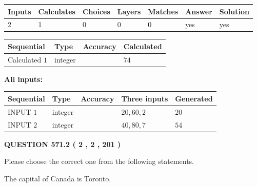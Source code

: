 \documentclass[12pt]{article}
\begin{document}
 

 
   
   
   
   
\noindent\begin{tabular}{|l|l|l|l|l|l|l|}
 \hline
Inputs & Calculates & Choices & Layers & Matches & Answer & Solution \\ \hline
 2  & 
 1  & 
 0
  & 
 0  & 
 0  & 
  yes & 
  yes 
  \\ \hline
 \end{tabular}
   
   
   
   
\noindent{}
   
   
  
  
\noindent\begin{tabular}{|l|l|l|l|}
\hline
 Sequential & Type & Accuracy & Calculated \\ 
\hline
 
 
  Calculated $  1 $ & integer &  & 
  $ 74 $ 
 \\  \hline  
 \end{tabular}
   
   
   
   
\noindent\vspace{0.1in}\hspace{-0.08in} {\textbf{\Large{All inputs: }}}
   
   
  
  
\noindent\begin{tabular}{|l|l|l|l|l|}
\hline
 Sequential & Type & Accuracy & Three inputs & Generated \\ 
\hline
 
 
  INPUT $  1 $ & integer &  & $
 20
 , 
 60
 , 
 2
 $ & $ 20 $ 
 \\  \hline  
 
 
  INPUT $  2 $ & integer &  & $
 40
 , 
 80
 , 
 7
 $ & $ 54 $ 
 \\  \hline  
 \end{tabular}
   
   
  
\vspace{0.2in}
  
{\textbf{\Large{QUESTION
571.2 
 ( 2 , 2 , 201 )
}}}
  
  
Please choose the correct one from the following statements.
 
 
The capital of Canada is Toronto.
 
\end{document}
